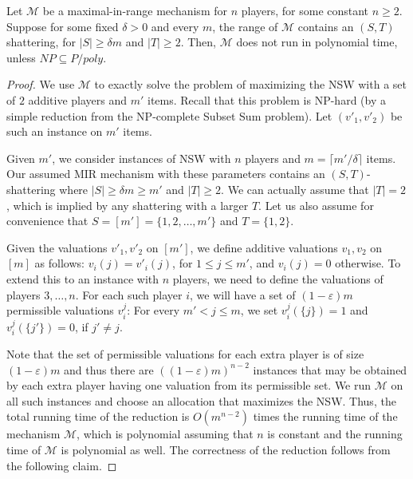 \documentclass{article}
\newcommand{\eps}{\varepsilon}
\newcommand{\cM}{{\mathcal M}}
\begin{document}
\begin{lemma}
Let $\cM$ be a maximal-in-range mechanism for $n$ players, for some constant $n \geq 2$. Suppose for some fixed $\delta>0$ and every $m$, the range of $\cM$ contains an $(S,T)$ shattering, for $|S| \geq \delta  m$ and $|T| \geq 2$. Then, $\cM$ does not run in polynomial time, unless $NP\subseteq P/poly$.
\end{lemma}

\begin{proof}
We use $\cM$ to exactly solve the problem of maximizing the NSW with a set of $2$ additive players and $m'$ items. Recall that this problem is NP-hard (by a simple reduction from the NP-complete Subset Sum problem). Let $(v'_1,v'_2)$ be such an instance on $m'$ items.

Given $m'$, we consider instances of NSW with $n$ players and $m = \lceil m' / \delta \rceil$ items. Our assumed MIR mechanism with these parameters contains an $(S,T)$-shattering where $|S| \geq \delta m \geq m'$ and $|T| \geq 2$. We can actually assume that $|T|=2$, which is implied by any shattering with a larger $T$. Let us also assume for convenience that $S = [m'] = \{1,2,\ldots, m'\}$ and $T = \{1,2\}$. 

Given the valuations $v'_1,v'_2$ on $[m']$, we define additive valuations $v_1,v_2$ on $[m]$ as follows: $v_i(j)=v'_i(j)$, for $1\leq j\leq m'$, and $v_i(j)=0$ otherwise. To extend this to an instance with $n$ players, we need to define the valuations of players $3,\ldots, n$. For each such player $i$, we will have a set of $(1-\eps) m$ permissible valuations $v^j_i$: For every $m' < j \leq m$, we set $v^j_i(\{j\})=1$ and $v^j_i(\{j'\})=0$, if $j'\neq j$.

Note that the set of permissible valuations for each extra player is of size $(1-\eps) m$ and thus there are $((1-\eps)m)^{n-2}$ instances that may be obtained by each extra player having one valuation from its permissible set. 
We run $\cM$ on all such instances and choose an allocation that maximizes the NSW. Thus, the total running time of the reduction is $O(m^{n-2})$ times the running time of the mechanism $\cM$, which is polynomial assuming that $n$ is constant and the running time of $\cM$ is polynomial as well. 
The correctness of the reduction follows from the following claim.






\end{proof}
\end{document}
